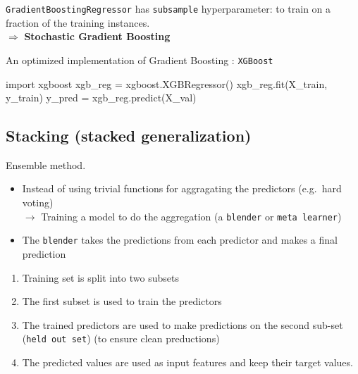 \verb;GradientBoostingRegressor; has \verb;subsample; hyperparameter: to train on a fraction of the training instances.\\
$\Rightarrow$ \textbf{Stochastic Gradient Boosting}

An optimized implementation of Gradient Boosting : \verb;XGBoost;
\begin{python}
    import xgboost
    xgb_reg = xgboost.XGBRegressor()
    xgb_reg.fit(X_train, y_train)
    y_pred = xgb_reg.predict(X_val)
\end{python}

\subsection{Stacking (stacked generalization)}
Ensemble method.
\begin{itemize}
    \item Instead of using trivial functions for aggragating the predictors (e.g.\ hard voting)\\
    $\rightarrow$ Training a model to do the aggregation (a \verb;blender; or \verb;meta learner;)
    \item The \verb;blender; takes the predictions from each predictor and makes a final prediction
\end{itemize}

\begin{enumerate}
    \item Training set is split into two subsets
    \item The first subset is used to train the predictors
    \item The trained predictors are used to make predictions on the second sub-set (\verb;held out set;) (to ensure clean preductions)
    \item The predicted values are used as input features and keep their target values.
\end{enumerate}

